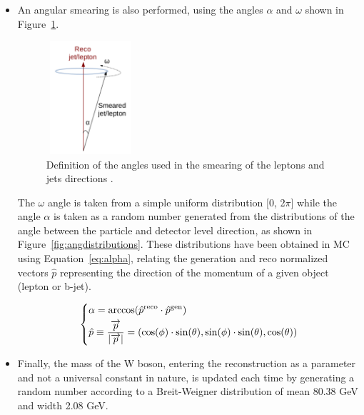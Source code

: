 \documentclass[a4paper, 10pt, openright]{report}
\begin{document}
\begin{itemize}
\item An angular smearing is also performed, using the angles $\alpha$ and $\omega$ shown in Figure~\ref{fig:angsmearing}. 

\begin{figure}[htbp]
\centering
\includegraphics[width=3.3cm, height=4.2cm]{figs/angularSmearing.png}
\caption{Definition of the angles used in the smearing of the leptons and jets directions \cite{DESYAN}.}
\label{fig:angsmearing}
\end{figure}

The $\omega$ angle is taken from a simple uniform distribution [0, 2$\pi$] while the angle $\alpha$ is taken as a random number generated from the distributions of the angle between the particle and detector level direction, as shown in Figure~\ref{fig:angdistributions}. These distributions have been obtained in \ac{MC} using Equation~\ref{eq:alpha}, relating the generation and reco normalized vectors $\hat{p}$ representing the direction of the momentum of a given object (lepton or b-jet).

\begin{equation}
\label{eq:alpha}
\begin{dcases}
\alpha = \arccos(\hat{p}^{\text{reco}} \cdot \hat{p}^{\text{gen}}) \\
\hat{p} \equiv \frac{\overrightarrow{p}}{|\overrightarrow{p}|} = (\cos(\phi) \cdot \sin(\theta), \sin(\phi) \cdot \sin(\theta), \cos(\theta))
\end{dcases}
\end{equation}

\item Finally, the mass of the W boson, entering the reconstruction as a parameter and not a universal constant in nature, is updated each time by generating a random number according to a Breit-Weigner distribution of mean 80.38 GeV and width 2.08 GeV.
\end{itemize}
\end{document}
